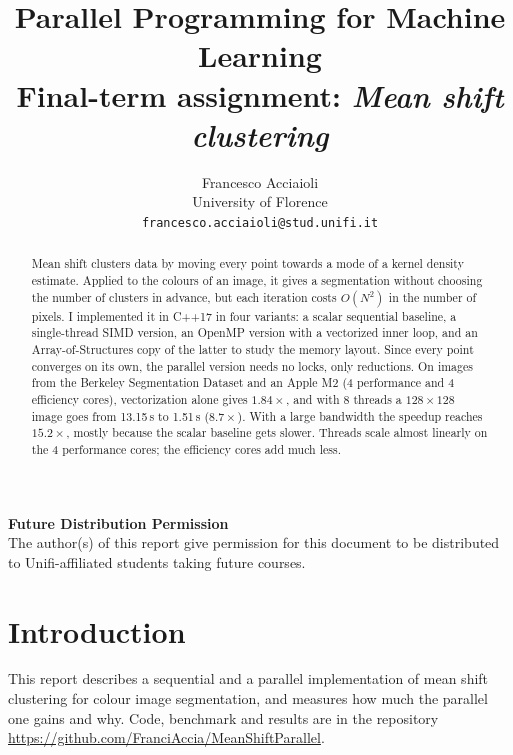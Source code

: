 \documentclass[10pt,twocolumn,letterpaper]{article}
\newcommand{\x}{\ensuremath{\times}}
\begin{document}
\title{Parallel Programming for Machine Learning \\ Final-term assignment: \textit{Mean shift clustering}}

\author{Francesco Acciaioli\\
University of Florence\\
{\tt\small francesco.acciaioli@stud.unifi.it}
}

\maketitle
\thispagestyle{empty}

\begin{abstract}
Mean shift clusters data by moving every point towards a mode of a kernel density estimate. Applied
to the colours of an image, it gives a segmentation without choosing the number of clusters in
advance, but each iteration costs $O(N^2)$ in the number of pixels. I implemented it in C++17 in
four variants: a scalar sequential baseline, a single-thread SIMD version, an OpenMP version with a
vectorized inner loop, and an Array-of-Structures copy of the latter to study the memory layout.
Since every point converges on its own, the parallel version needs no locks, only reductions. On
images from the Berkeley Segmentation Dataset and an Apple M2 (4 performance and 4 efficiency
cores), vectorization alone gives $1.84\x$, and with 8 threads a $128\x128$ image goes from
13.15\,s to 1.51\,s ($8.7\x$). With a large bandwidth the speedup reaches $15.2\x$, mostly because
the scalar baseline gets slower. Threads scale almost linearly on the 4 performance cores; the
efficiency cores add much less.
\end{abstract}

\noindent\large\textbf{Future Distribution Permission}\\
\indent The author(s) of this report give permission for this document to be distributed to Unifi-affiliated students taking future courses.

\section{Introduction}

This report describes a sequential and a parallel implementation of mean shift clustering for
colour image segmentation, and measures how much the parallel one gains and why. Code, benchmark
and results are in the repository
\url{https://github.com/FranciAccia/MeanShiftParallel}.
\end{document}
